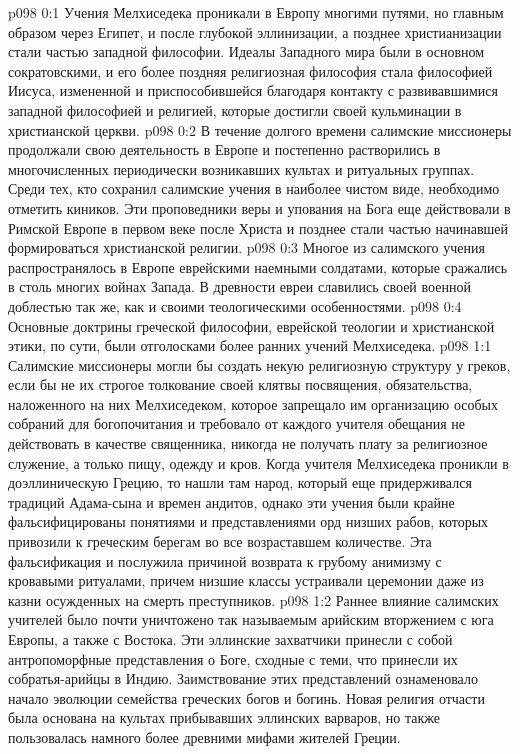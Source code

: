 \author{Мелхиседек}
\vs p098 0:1 Учения Мелхиседека проникали в Европу многими путями, но главным образом через Египет, и после глубокой эллинизации, а позднее христианизации стали частью западной философии. Идеалы Западного мира были в основном сократовскими, и его более поздняя религиозная философия стала философией Иисуса, измененной и приспособившейся благодаря контакту с развивавшимися западной философией и религией, которые достигли своей кульминации в христианской церкви.
\vs p098 0:2 В течение долгого времени салимские миссионеры продолжали свою деятельность в Европе и постепенно растворились в многочисленных периодически возникавших культах и ритуальных группах. Среди тех, кто сохранил салимские учения в наиболее чистом виде, необходимо отметить киников. Эти проповедники веры и упования на Бога еще действовали в Римской Европе в первом веке после Христа и позднее стали частью начинавшей формироваться христианской религии.
\vs p098 0:3 Многое из салимского учения распространялось в Европе еврейскими наемными солдатами, которые сражались в столь многих войнах Запада. В древности евреи славились своей военной доблестью так же, как и своими теологическими особенностями.
\vs p098 0:4 Основные доктрины греческой философии, еврейской теологии и христианской этики, по сути, были отголосками более ранних учений Мелхиседека.
\vs p098 1:1 Салимские миссионеры могли бы создать некую религиозную структуру у греков, если бы не их строгое толкование своей клятвы посвящения, обязательства, наложенного на них Мелхиседеком, которое запрещало им организацию особых собраний для богопочитания и требовало от каждого учителя обещания не действовать в качестве священника, никогда не получать плату за религиозное служение, а только пищу, одежду и кров. Когда учителя Мелхиседека проникли в доэллиническую Грецию, то нашли там народ, который еще придерживался традиций Адама\hyp{}сына и времен андитов, однако эти учения были крайне фальсифицированы понятиями и представлениями орд низших рабов, которых привозили к греческим берегам во все возраставшем количестве. Эта фальсификация и послужила причиной возврата к грубому анимизму с кровавыми ритуалами, причем низшие классы устраивали церемонии даже из казни осужденных на смерть преступников.
\vs p098 1:2 Раннее влияние салимских учителей было почти уничтожено так называемым арийским вторжением с юга Европы, а также с Востока. Эти эллинские захватчики принесли с собой антропоморфные представления о Боге, сходные с теми, что принесли их собратья\hyp{}арийцы в Индию. Заимствование этих представлений ознаменовало начало эволюции семейства греческих богов и богинь. Новая религия отчасти была основана на культах прибывавших эллинских варваров, но также пользовалась намного более древними мифами жителей Греции.
